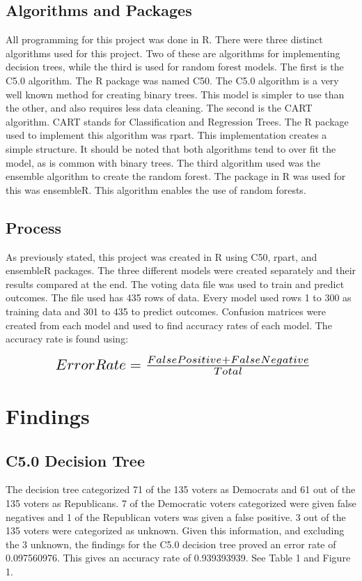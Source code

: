 \documentclass{article}
\begin{document}
\subsection{Algorithms and Packages}
    All programming for this project was done in R. There were three distinct algorithms used for this project. Two of these are algorithms for implementing decision trees, while the third is used for random forest models. The first is the C5.0 algorithm. The R package was named C50. The C5.0 algorithm is a very well known method for creating binary trees. This model is simpler to use than the other, and also requires less data cleaning. The second is the CART algorithm. CART stands for Classification and Regression Trees. The R package used to implement this algorithm was rpart. This implementation creates a simple structure. It should be noted that both algorithms tend to over fit the model, as is common with binary trees. The third algorithm used was the ensemble algorithm to create the random forest. The package in R was used for this was ensembleR.  This algorithm enables the use of random forests.
\subsection{Process}
    As previously stated, this project was created in R using C50, rpart, and ensembleR packages. The three different models were created separately and their results compared at the end. The voting data file was used to train and predict outcomes. The file used has 435 rows of data. Every model used rows 1 to 300 as training data and 301 to 435 to predict outcomes. Confusion matrices were created from each model and used to find accuracy rates of each model. The accuracy rate is found using:

\[ \scalebox{1.5}{ $Error Rate = \frac{False Positive + False Negative}{Total}  $} \]

%
%
\section{Findings}
\subsection{C5.0 Decision Tree}
The decision tree categorized 71 of the 135 voters as Democrats and 61 out of the 135 voters as Republicans. 7 of the Democratic voters categorized were given false negatives and 1 of the Republican voters was given a false positive. 3 out of the 135 voters were categorized as unknown. Given this information, and excluding the 3 unknown, the findings for the C5.0 decision tree proved an error rate of 0.097560976. This gives an accuracy rate of 0.939393939. See Table 1 and Figure 1.
\end{document}
